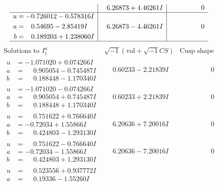 \documentclass[1p]{elsarticle_modified}
\theoremstyle{definition}
\newcommand{\I}{\sqrt{-1}}
\begin{document}
$$\begin{array}{c|c|c}
 & \phantom{-}6.26873 + 4.46261 I & \phantom{-0.000000 } 0 \\ \hline\begin{aligned}
u &= -0.726012 - 0.578316 I \\
a &= \phantom{-}0.54695 - 2.85419 I \\
b &= \phantom{-}0.189203 + 1.238060 I\end{aligned}
 & \phantom{-}6.26873 - 4.46261 I & \phantom{-0.000000 } 0\\
 \hline 
 \end{array}$$\newpage$$\begin{array}{c|c|c}  
\text{Solutions to }I^u_{1}& \I (\text{vol} + \sqrt{-1}CS) & \text{Cusp shape}\\
 \hline 
\begin{aligned}
u &= -1.071020 + 0.074266 I \\
a &= \phantom{-}0.905054 - 0.745487 I \\
b &= \phantom{-}0.188448 - 1.170340 I\end{aligned}
 & \phantom{-}0.60233 - 2.21839 I & \phantom{-0.000000 } 0 \\ \hline\begin{aligned}
u &= -1.071020 - 0.074266 I \\
a &= \phantom{-}0.905054 + 0.745487 I \\
b &= \phantom{-}0.188448 + 1.170340 I\end{aligned}
 & \phantom{-}0.60233 + 2.21839 I & \phantom{-0.000000 } 0 \\ \hline\begin{aligned}
u &= \phantom{-}0.751622 + 0.766640 I \\
a &= -0.72034 + 1.55866 I \\
b &= \phantom{-}0.424803 - 1.293130 I\end{aligned}
 & \phantom{-}6.20636 + 7.20016 I & \phantom{-0.000000 } 0 \\ \hline\begin{aligned}
u &= \phantom{-}0.751622 - 0.766640 I \\
a &= -0.72034 - 1.55866 I \\
b &= \phantom{-}0.424803 + 1.293130 I\end{aligned}
 & \phantom{-}6.20636 - 7.20016 I & \phantom{-0.000000 } 0 \\ \hline\begin{aligned}
u &= \phantom{-}0.523556 + 0.937772 I \\
a &= \phantom{-}0.19336 - 1.55260 I \\

\end{aligned}
\end{array}$$
\end{document}
